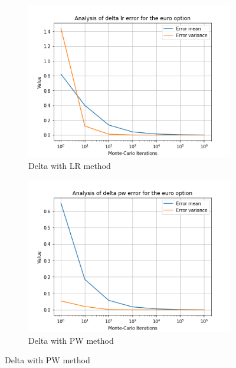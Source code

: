\documentclass[12pt,a4paper,fleqn]{article}
\begin{document}
\begin{figure}
  \centering
      \begin{subfigure}[b]{0.45\textwidth}
          \includegraphics[width=\textwidth]{graphs/eurodeltalr.png}
          \caption{Delta with LR method}
      \end{subfigure}
      \begin{subfigure}[b]{0.45\textwidth}
          \includegraphics[width=\textwidth]{graphs/eurodeltapw.png}
          \caption{Delta with PW method}
      \end{subfigure}


\end{figure}
\end{document}
